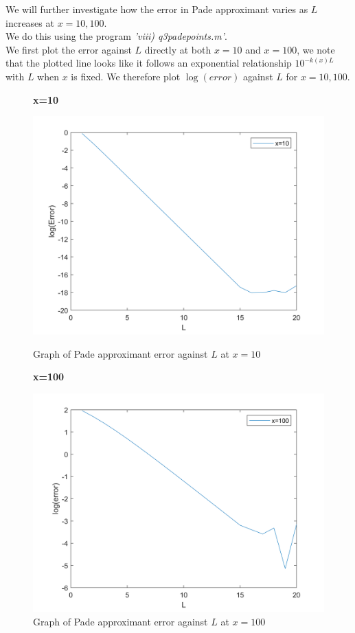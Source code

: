 \documentclass[10pt]{article}
\begin{document}
\noindent We will further investigate how the error in Pade approximant varies as $L$ increases at $x=10,100$.\\
We do this using the program \emph{'viii) q3\textunderscore pade\textunderscore points.m'}.\\
We first plot the error against $L$ directly at both $x=10$ and $x=100$, we note that the plotted line looks like it follows an exponential relationship $10^{-k(x)L}$ with $L$ when $x$ is fixed. We therefore plot $\log(error)$ against $L$ for $x=10,100$.\\
\begin{figure}[H]
    \begin{minipage}[b]{0.47\linewidth}
            \centering
            \textbf{x=10}\par
            \includegraphics[width=\textwidth]{Files/q3_pp_10_log.png}
            \caption{Graph of Pade approximant error against $L$ at $x=10$}
        \end{minipage}
        \hfill
    \begin{minipage}[b]{0.47\linewidth}
            \centering
            \textbf{x=100}\par
            \includegraphics[width=\textwidth]{Files/q3_pp_100_log.png}
            \caption{Graph of Pade approximant error against $L$ at $x=100$}
        \end{minipage}
\end{figure}
\end{document}
